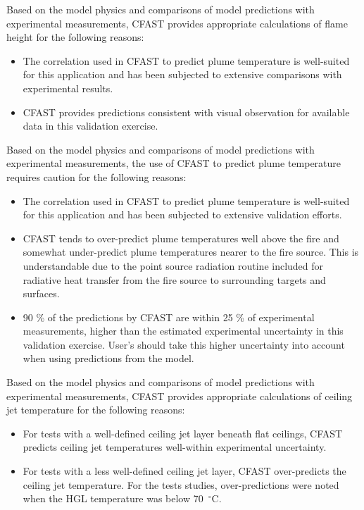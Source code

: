 Based on the model physics and comparisons of model predictions with experimental measurements, CFAST provides appropriate calculations of flame height for the following reasons:

\begin{itemize}
\item The correlation used in CFAST to predict plume temperature is well-suited for this application and has been subjected to extensive comparisons with experimental results.
\item CFAST provides predictions consistent with visual observation for available data in this validation exercise.
\end{itemize}

Based on the model physics and comparisons of model predictions with experimental measurements, the use of CFAST to predict plume temperature requires caution for the following reasons:

\begin{itemize}
\item The correlation used in CFAST to predict plume temperature is well-suited for this application and has been subjected to extensive validation efforts.
\item CFAST tends to over-predict plume temperatures well above the fire and somewhat under-predict plume temperatures nearer to the fire source.  This is understandable due to the point source radiation routine included for radiative heat transfer from the fire source to surrounding targets and surfaces.
\item 90 \% of the predictions by CFAST are within 25 \% of experimental measurements, higher than the estimated experimental uncertainty in this validation exercise.  User's should take this higher uncertainty into account when using predictions from the model.
\end{itemize}

Based on the model physics and comparisons of model predictions with experimental measurements, CFAST provides appropriate calculations of ceiling jet temperature for the following reasons:
\begin{itemize}
\item For tests with a well-defined ceiling jet layer beneath flat ceilings, CFAST predicts ceiling jet temperatures well-within experimental uncertainty.
\item For tests with a less well-defined ceiling jet layer, CFAST over-predicts the ceiling jet temperature.  For the tests studies, over-predictions were noted when the HGL temperature was below 70~$^\circ$C.
\end{itemize}

